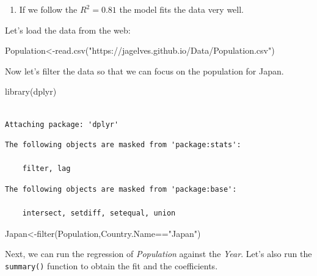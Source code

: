 \documentclass[
  letterpaper,
  DIV=11,
  numbers=noendperiod]{scrreprt}
\newenvironment{Shaded}{\begin{snugshade}}{\end{snugshade}}
\newcommand{\FunctionTok}[1]{\textcolor[rgb]{0.28,0.35,0.67}{#1}}
\newcommand{\NormalTok}[1]{\textcolor[rgb]{0.00,0.23,0.31}{#1}}
\newcommand{\OtherTok}[1]{\textcolor[rgb]{0.00,0.23,0.31}{#1}}
\newcommand{\SpecialCharTok}[1]{\textcolor[rgb]{0.37,0.37,0.37}{#1}}
\newcommand{\StringTok}[1]{\textcolor[rgb]{0.13,0.47,0.30}{#1}}
\providecommand{\tightlist}{%
  \setlength{\itemsep}{0pt}\setlength{\parskip}{0pt}}\usepackage{longtable,booktabs,array}
\begin{document}
\begin{enumerate}
\def\labelenumi{\arabic{enumi}.}
\tightlist
\item
  If we follow the \(R^2=0.81\) the model fits the data very well.
\end{enumerate}

Let's load the data from the web:

\begin{Shaded}
\begin{Highlighting}[numbers=left,,]
\NormalTok{Population}\OtherTok{\textless{}{-}}\FunctionTok{read.csv}\NormalTok{(}\StringTok{"https://jagelves.github.io/Data/Population.csv"}\NormalTok{)}
\end{Highlighting}
\end{Shaded}

Now let's filter the data so that we can focus on the population for
Japan.

\begin{Shaded}
\begin{Highlighting}[numbers=left,,]
\FunctionTok{library}\NormalTok{(dplyr)}
\end{Highlighting}
\end{Shaded}

\begin{verbatim}

Attaching package: 'dplyr'
\end{verbatim}

\begin{verbatim}
The following objects are masked from 'package:stats':

    filter, lag
\end{verbatim}

\begin{verbatim}
The following objects are masked from 'package:base':

    intersect, setdiff, setequal, union
\end{verbatim}

\begin{Shaded}
\begin{Highlighting}[numbers=left,,]
\NormalTok{Japan}\OtherTok{\textless{}{-}}\FunctionTok{filter}\NormalTok{(Population,Country.Name}\SpecialCharTok{==}\StringTok{"Japan"}\NormalTok{)}
\end{Highlighting}
\end{Shaded}

Next, we can run the regression of \emph{Population} against the
\emph{Year}. Let's also run the \texttt{summary()} function to obtain
the fit and the coefficients.
\end{document}
